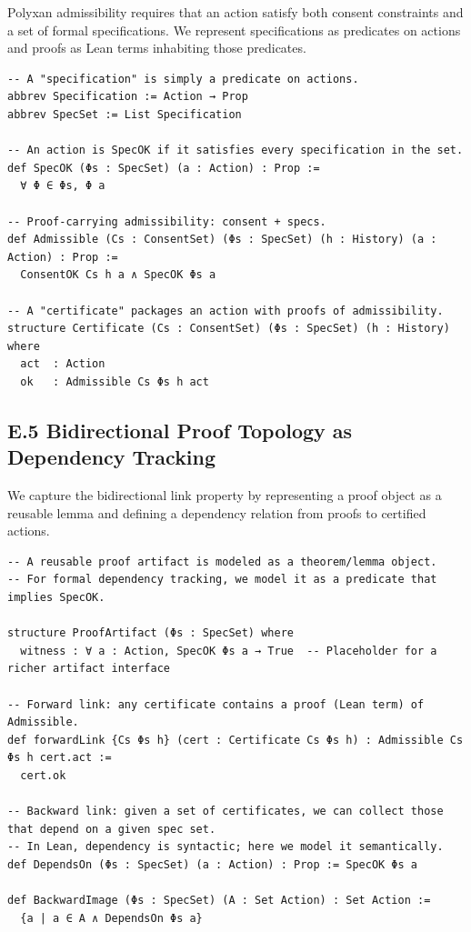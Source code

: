 \documentclass[11pt,oneside]{article}
\begin{document}
Polyxan admissibility requires that an action satisfy both consent constraints and a set of formal specifications. We represent specifications as predicates on actions and proofs as Lean terms inhabiting those predicates.

\begin{verbatim}
-- A "specification" is simply a predicate on actions.
abbrev Specification := Action → Prop
abbrev SpecSet := List Specification

-- An action is SpecOK if it satisfies every specification in the set.
def SpecOK (Φs : SpecSet) (a : Action) : Prop :=
  ∀ Φ ∈ Φs, Φ a

-- Proof-carrying admissibility: consent + specs.
def Admissible (Cs : ConsentSet) (Φs : SpecSet) (h : History) (a : Action) : Prop :=
  ConsentOK Cs h a ∧ SpecOK Φs a

-- A "certificate" packages an action with proofs of admissibility.
structure Certificate (Cs : ConsentSet) (Φs : SpecSet) (h : History) where
  act  : Action
  ok   : Admissible Cs Φs h act
\end{verbatim}

\subsection{E.5 Bidirectional Proof Topology as Dependency Tracking}

We capture the bidirectional link property by representing a proof object as a reusable lemma and defining a dependency relation from proofs to certified actions.

\begin{verbatim}
-- A reusable proof artifact is modeled as a theorem/lemma object.
-- For formal dependency tracking, we model it as a predicate that implies SpecOK.

structure ProofArtifact (Φs : SpecSet) where
  witness : ∀ a : Action, SpecOK Φs a → True  -- Placeholder for a richer artifact interface

-- Forward link: any certificate contains a proof (Lean term) of Admissible.
def forwardLink {Cs Φs h} (cert : Certificate Cs Φs h) : Admissible Cs Φs h cert.act :=
  cert.ok

-- Backward link: given a set of certificates, we can collect those that depend on a given spec set.
-- In Lean, dependency is syntactic; here we model it semantically.
def DependsOn (Φs : SpecSet) (a : Action) : Prop := SpecOK Φs a

def BackwardImage (Φs : SpecSet) (A : Set Action) : Set Action :=
  {a | a ∈ A ∧ DependsOn Φs a}
\end{verbatim}
\end{document}
